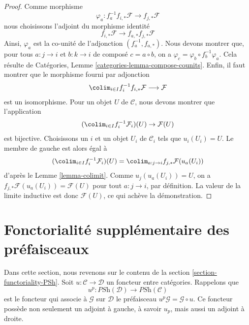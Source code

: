 \begin{proof}
Comme morphisme
$$
\varphi_a : f_a^{-1}f_{i, *}\mathcal{F} \to f_{j, *}\mathcal{F}
$$
nous choisissons l’adjoint du morphisme identité
$$
f_{i, *}\mathcal{F} \to f_{a, *}f_{j, *}\mathcal{F}
$$
Ainsi, $\varphi_a$ est la co-unité de l’adjonction
$(f_a^{-1}, f_{a, *})$. Nous devons montrer que, pour tous
$a : j \to i$ et $b : k \to i$ de composé $c = a \circ b$, on a
$\varphi_c = \varphi_b \circ f_b^{-1}\varphi_a$.
Cela résulte de Catégories, Lemme \ref{categories-lemma-compose-counits}.
Enfin, il faut montrer que le morphisme fourni par adjonction
$$
\colim_{i \in I} f_i^{-1}f_{i, *}\mathcal{F}
\longrightarrow
\mathcal{F}
$$
est un isomorphisme. Pour un objet $U$ de $\mathcal{C}$,
nous devons montrer que l’application
$$
(\colim_{i \in I} f_i^{-1}\mathcal{F}_i)(U) \to \mathcal{F}(U)
$$
est bijective. Choisissons un $i$ et un objet $U_i$ de $\mathcal{C}_i$
tels que $u_i(U_i) = U$. Le membre de gauche est alors égal à
$$
(\colim_{i \in I} f_i^{-1}\mathcal{F}_i)(U) =
\colim_{a : j \to i} f_{j, *}\mathcal{F}(u_a(U_i))
$$
d’après le Lemme \ref{lemma-colimit}. Comme $u_j(u_a(U_i)) = U$,
on a $f_{j, *}\mathcal{F}(u_a(U_i)) = \mathcal{F}(U)$
pour tout $a : j \to i$, par définition. La valeur de la limite inductive
est donc $\mathcal{F}(U)$, ce qui achève la démonstration.
\end{proof}











\section{Fonctorialité supplémentaire des préfaisceaux}
\label{section-more-functoriality-PSh}

\noindent
Dans cette section, nous revenons sur le contenu de la
section \ref{section-functoriality-PSh}.
Soit $u : \mathcal{C} \to \mathcal{D}$ un foncteur entre catégories.
Rappelons que
$$
u^p :
\textit{PSh}(\mathcal{D})
\longrightarrow
\textit{PSh}(\mathcal{C})
$$
est le foncteur qui associe à $\mathcal{G}$ sur $\mathcal{D}$ le préfaisceau
$u^p\mathcal{G} = \mathcal{G} \circ u$. Ce foncteur possède non seulement
un adjoint à gauche, à savoir $u_p$, mais aussi un adjoint à droite.

